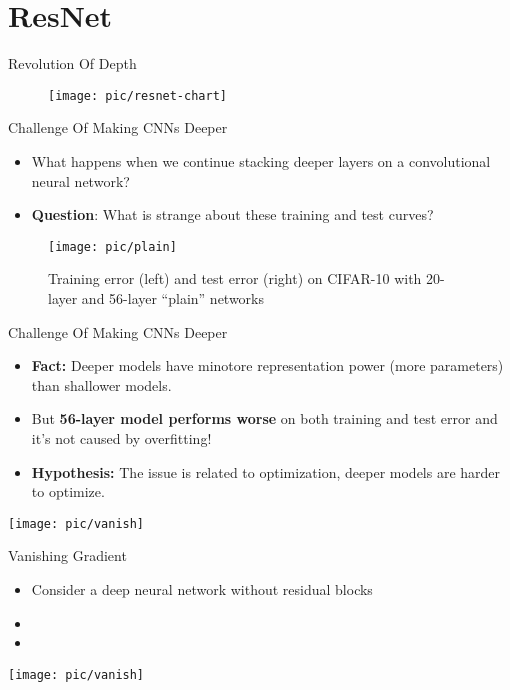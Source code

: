 \documentclass[serif, aspectratio=169]{beamer}
\begin{document}
\section{ResNet}

\begin{frame}{Revolution Of Depth}
	\begin{figure}[htpb]
		\begin{center}
			\texttt{[image: pic/resnet-chart]}
		\end{center}
	\end{figure}
\end{frame}

\begin{frame}{Challenge Of Making CNNs Deeper}
	\begin{itemize}
		\item What happens when we continue stacking deeper layers on a convolutional neural network?
		\item \textbf{Question}: What is strange about these training and test curves?
	\end{itemize}
	\begin{figure}[htpb]
		\begin{center}
			\texttt{[image: pic/plain]}
			\captionsetup{justification=centering}
			\caption*{\scriptsize{Training error (left) and test error (right) on CIFAR-10 with 20-layer and 56-layer “plain” networks}}
		\end{center}
	\end{figure}
\end{frame}

\begin{frame}{Challenge Of Making CNNs Deeper}
	\begin{itemize}
		\item \textbf{Fact:} Deeper models have minotore representation power (more parameters) than shallower models.
		\item But \textbf{56-layer model performs worse} on both training and test error and it's not caused by overfitting!
		\item \textbf{Hypothesis:} The issue is related to optimization, deeper models are harder to optimize.	
	\end{itemize}
	\vspace{-0.5cm}
	\centering
	\texttt{[image: pic/vanish]}
\end{frame}


\begin{frame}{Vanishing Gradient}
	\begin{itemize}
		\item Consider a deep neural network without residual blocks
		\item  
		\item 
	\end{itemize}
	\vspace{-0.5cm}
	\centering
	\texttt{[image: pic/vanish]}
\end{frame}
\end{document}
